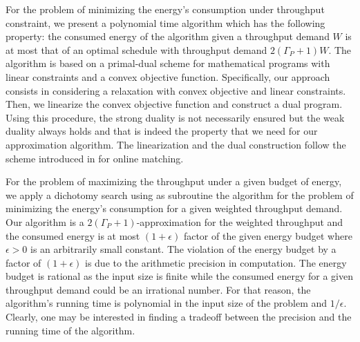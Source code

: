\documentclass[11pt,a4paper]{article}
\begin{document}
For the problem of minimizing the energy's consumption under throughput constraint,
we present a polynomial time algorithm which has the following property: 
the consumed energy
of the algorithm given a throughput demand $W$ is at most that 
of an optimal schedule with throughput demand $2(\Gamma_{P}+1)W$.  
The algorithm is based on a primal-dual scheme for mathematical programs with 
linear constraints and a convex objective function. Specifically, our approach consists in 
considering a relaxation with convex objective and linear constraints. Then, we
linearize the convex objective function and construct a dual program. Using this procedure,
the strong duality is not necessarily ensured but the weak duality always holds and 
that is indeed the property that we need for our approximation algorithm. The linearization and 
the dual construction follow the scheme introduced in \cite{DevanurJain12:Online-matching}
for online matching.  

For the problem of maximizing 
the throughput under a given budget of energy, we apply a dichotomy search 
using as subroutine the algorithm for the problem of minimizing the energy's consumption for a given weighted throughput demand.
Our algorithm is a $2(\Gamma_{P}+1)$-approximation for the weighted throughput  
and the consumed energy is at most $(1+\epsilon)$ factor of the given energy budget
where $\epsilon > 0$ is an arbitrarily small constant. The violation of  the 
energy budget by a factor of $(1+\epsilon)$ is due to the arithmetic precision in computation.
The energy budget is rational as the input size is finite while the consumed 
energy for a given throughput demand could be an irrational number. For that reason,
the algorithm's running time is polynomial in the input size of the problem 
and  $1/\epsilon$. Clearly, one may be interested in finding a 
tradeoff between the precision and the running time of the algorithm.   
 
\end{document}
